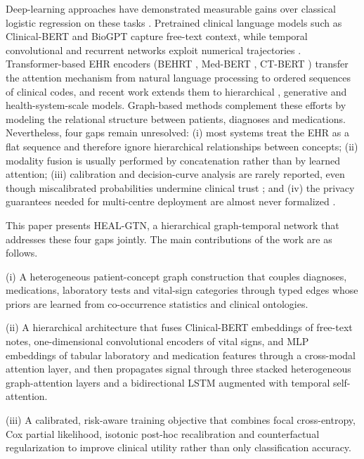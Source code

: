 \documentclass[conference]{IEEEtran}
\begin{document}
Deep-learning approaches have demonstrated measurable gains over classical logistic regression on these tasks \cite{choi2016retain,shickel2018,rajkomar2019}. Pretrained clinical language models such as Clinical-BERT \cite{alsentzer2019} and BioGPT \cite{luo2022biogpt} capture free-text context, while temporal convolutional and recurrent networks exploit numerical trajectories \cite{harutyunyan2019,vaswani2017,zhou2021informer}. Transformer-based EHR encoders (BEHRT \cite{li2020behrt}, Med-BERT \cite{rasmy2021medbert}, CT-BERT \cite{yang2022gatortron}) transfer the attention mechanism from natural language processing to ordered sequences of clinical codes, and recent work extends them to hierarchical \cite{li2023hibehrt}, generative \cite{yang2023transformehr} and health-system-scale \cite{jiang2023nyutron} models. Graph-based methods \cite{choi2017gram,choi2020gct,jiang2024graphcare} complement these efforts by modeling the relational structure between patients, diagnoses and medications. Nevertheless, four gaps remain unresolved: (i) most systems treat the EHR as a flat sequence and therefore ignore hierarchical relationships between concepts; (ii) modality fusion is usually performed by concatenation rather than by learned attention; (iii) calibration and decision-curve analysis are rarely reported, even though miscalibrated probabilities undermine clinical trust \cite{vancalster2019}; and (iv) the privacy guarantees needed for multi-centre deployment are almost never formalized \cite{ponomareva2023}.

This paper presents HEAL-GTN, a hierarchical graph-temporal network that addresses these four gaps jointly. The main contributions of the work are as follows.

(i) A heterogeneous patient-concept graph construction that couples diagnoses, medications, laboratory tests and vital-sign categories through typed edges whose priors are learned from co-occurrence statistics and clinical ontologies.

(ii) A hierarchical architecture that fuses Clinical-BERT embeddings of free-text notes, one-dimensional convolutional encoders of vital signs, and MLP embeddings of tabular laboratory and medication features through a cross-modal attention layer, and then propagates signal through three stacked heterogeneous graph-attention layers and a bidirectional LSTM augmented with temporal self-attention.

(iii) A calibrated, risk-aware training objective that combines focal cross-entropy, Cox partial likelihood, isotonic post-hoc recalibration and counterfactual regularization to improve clinical utility rather than only classification accuracy.
\end{document}
